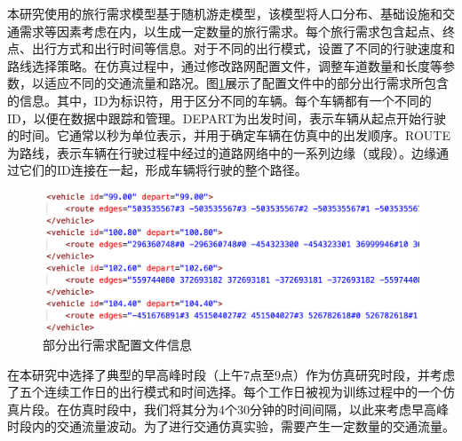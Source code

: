 本研究使用的旅行需求模型基于随机游走模型，该模型将人口分布、基础设施和交通需求等因素考虑在内，以生成一定数量的旅行需求。每个旅行需求包含起点、终点、出行方式和出行时间等信息。对于不同的出行模式，设置了不同的行驶速度和路线选择策略。在仿真过程中，通过修改路网配置文件，调整车道数量和长度等参数，以适应不同的交通流量和路况。图\ref{demand}展示了配置文件中的部分出行需求所包含的信息。其中，ID为标识符，用于区分不同的车辆。每个车辆都有一个不同的ID，以便在数据中跟踪和管理。DEPART为出发时间，表示车辆从起点开始行驶的时间。它通常以秒为单位表示，并用于确定车辆在仿真中的出发顺序。ROUTE为路线，表示车辆在行驶过程中经过的道路网络中的一系列边缘（或段）。边缘通过它们的ID连接在一起，形成车辆将行驶的整个路径。
\begin{figure}[H]
  \centering
  \includegraphics[width=.75\linewidth]{figures/content/demand.png}
  \caption{部分出行需求配置文件信息}
  \label{demand}
\end{figure}


在本研究中选择了典型的早高峰时段（上午7点至9点）作为仿真研究时段，并考虑了五个连续工作日的出行模式和时间选择。每个工作日被视为训练过程中的一个仿真片段。在仿真时段中，我们将其分为4个30分钟的时间间隔，以此来考虑早高峰时段内的交通流量波动。为了进行交通仿真实验，需要产生一定数量的交通流量。

